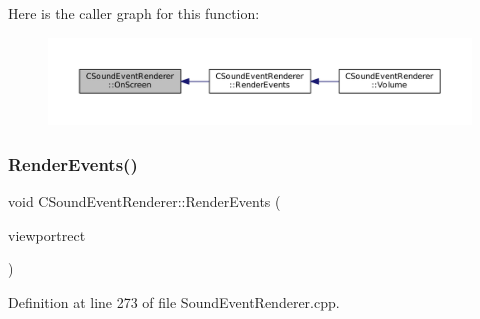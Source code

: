 Here is the caller graph for this function\+:\nopagebreak
\begin{figure}[H]
\begin{center}
\leavevmode
\includegraphics[width=350pt]{classCSoundEventRenderer_a9df97d476a3a39cb7126db9c366c2f0c_icgraph}
\end{center}
\end{figure}
\hypertarget{classCSoundEventRenderer_aa8b0c3029ea920ae4f4a08b9d9dd1c9c}{}\label{classCSoundEventRenderer_aa8b0c3029ea920ae4f4a08b9d9dd1c9c} 
\subsubsection{\texorpdfstring{Render\+Events()}{RenderEvents()}}
{\footnotesize\ttfamily void C\+Sound\+Event\+Renderer\+::\+Render\+Events (\begin{DoxyParamCaption}\item[{const \hyperlink{structSRectangle}{S\+Rectangle} \&}]{viewportrect }\end{DoxyParamCaption})}



Definition at line 273 of file Sound\+Event\+Renderer.\+cpp.


